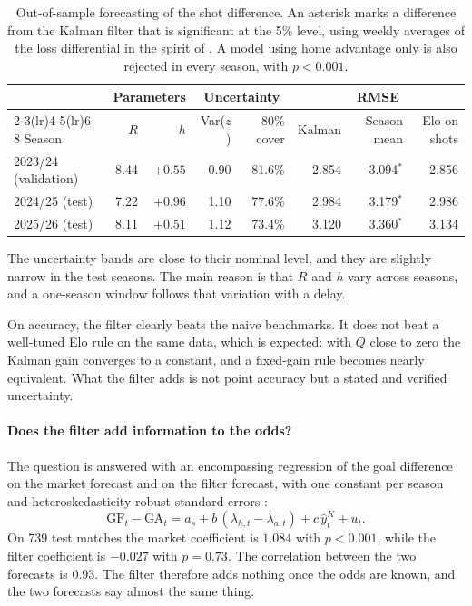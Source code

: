 \documentclass[11pt,a4paper]{article}
\begin{document}
\begin{table}[H]
\centering\small
\begin{tabular}{lrrrrrrr}
\toprule
& \multicolumn{2}{c}{Parameters} & \multicolumn{2}{c}{Uncertainty} & \multicolumn{3}{c}{RMSE} \\
\cmidrule(lr){2-3}\cmidrule(lr){4-5}\cmidrule(lr){6-8}
Season & $R$ & $h$ & Var($z$) & 80\% cover & Kalman & Season mean & Elo on shots \\
\midrule
2023/24 (validation) & 8.44 & $+0.55$ & 0.90 & 81.6\% & 2.854 & 3.094$^{*}$ & 2.856 \\
2024/25 (test) & 7.22 & $+0.96$ & 1.10 & 77.6\% & 2.984 & 3.179$^{*}$ & 2.986 \\
2025/26 (test) & 8.11 & $+0.51$ & 1.12 & 73.4\% & 3.120 & 3.360$^{*}$ & 3.134 \\
\bottomrule
\end{tabular}
\caption{Out-of-sample forecasting of the shot difference. An asterisk marks a difference from the
Kalman filter that is significant at the 5\% level, using weekly averages of the loss differential in
the spirit of \citet{dieboldmariano1995}. A model using home advantage only is also rejected in every
season, with $p < 0.001$.}
\label{tab:oos}
\end{table}

The uncertainty bands are close to their nominal level, and they are slightly narrow in the test
seasons. The main reason is that $R$ and $h$ vary across seasons, and a one-season window follows that
variation with a delay.

On accuracy, the filter clearly beats the naive benchmarks. It does not beat a well-tuned Elo rule on
the same data, which is expected: with $Q$ close to zero the Kalman gain converges to a constant, and a
fixed-gain rule becomes nearly equivalent. What the filter adds is not point accuracy but a stated and
verified uncertainty.

\paragraph{Does the filter add information to the odds?} The question is answered with an encompassing
regression of the goal difference on the market forecast and on the filter forecast, with one constant
per season and heteroskedasticity-robust standard errors \citep{white1980}:
\begin{equation}
\text{GF}_t - \text{GA}_t = a_s + b\,(\lambda_{h,t} - \lambda_{a,t}) + c\,\hat y^{K}_t + u_t .
\end{equation}
On 739 test matches the market coefficient is $1.084$ with $p < 0.001$, while the filter coefficient is
$-0.027$ with $p = 0.73$. The correlation between the two forecasts is $0.93$. The filter therefore
adds nothing once the odds are known, and the two forecasts say almost the same thing.
\end{document}
